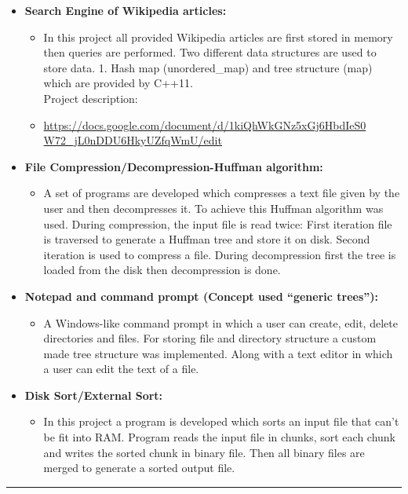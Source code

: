 \documentclass[9pt,a4paper]{article}
\newcommand{\MyHorizontalLine}{\noindent\rule{\linewidth}{1.5pt}\\}
\begin{document}
\begin{itemize}
		\item \textbf{Search Engine of Wikipedia articles:}
		\begin{itemize}
			\item[]In this project all provided Wikipedia articles are first stored in memory then queries are performed. Two different data structures are used to store data. 1. Hash map (unordered\_map) and tree structure (map) which are provided by C++11.\\
			Project description:
			\item[]\raggedright\href{https://docs.google.com/document/d/1kiQhWkGNz5xGj6HbdIeS0 W72_jL0nDDU6HkyUZfqWmU/edit}{https://docs.google.com/document/d/1kiQhWkGNz5xGj6HbdIeS0 W72\_jL0nDDU6HkyUZfqWmU/edit}
		\end{itemize}
		
		\item \textbf{File Compression/Decompression-Huffman algorithm:}
		\begin{itemize}
			\item[]A set of programs are developed which compresses a text file given by the user and then decompresses it. To achieve this Huffman algorithm was used. During compression, the input file is read twice: First iteration file is traversed to generate a Huffman tree and store it on disk. Second iteration is used to compress a file. During decompression first the tree is loaded from the disk then decompression is done.
		\end{itemize}
		
		\item \textbf{Notepad and command prompt (Concept used “generic trees”):}
		\begin{itemize}
			\item[]A Windows-like command prompt in which a user can create, edit, delete directories and files. For storing file and directory structure a custom made tree structure was implemented. Along with a text editor in which a user can edit the text of a file.
		\end{itemize}
		
		\item \textbf{Disk Sort/External Sort:}
		\begin{itemize}
			\item[]In this project a program is developed which sorts an input file that can’t be fit into
			RAM. Program reads the input file in chunks, sort each chunk and writes the sorted chunk in binary file. Then all binary files are merged to generate a sorted output file.
		\end{itemize}
	
	\end{itemize}
	\MyHorizontalLine
\end{document}
